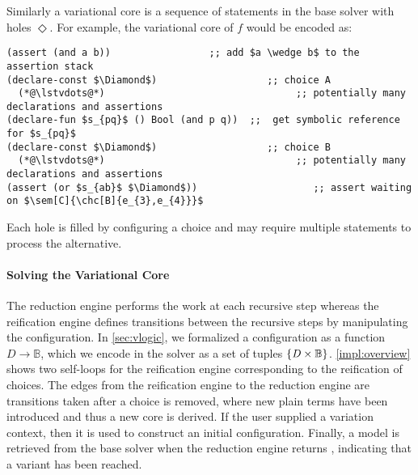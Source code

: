 Similarly a variational core is a sequence of statements in the base solver with
holes $\Diamond$. For example, the variational core of $f$ would be encoded as:
%
\begin{lstlisting}[columns=flexible,keepspaces=true]
(assert (and a b))                 ;; add $a \wedge b$ to the assertion stack
(declare-const $\Diamond$)                   ;; choice A
  (*@\lstvdots@*)                                 ;; potentially many declarations and assertions
(declare-fun $s_{pq}$ () Bool (and p q))  ;;  get symbolic reference for $s_{pq}$
(declare-const $\Diamond$)                   ;; choice B
  (*@\lstvdots@*)                                 ;; potentially many declarations and assertions
(assert (or $s_{ab}$ $\Diamond$))                    ;; assert waiting on $\sem[C]{\chc[B]{e_{3},e_{4}}}$
\end{lstlisting}
%
Each hole is filled by configuring a choice and may require multiple
statements to process the alternative.

\paragraph{Solving the Variational Core}

The reduction engine performs the work at each recursive step whereas the
reification engine defines transitions between the recursive steps by
manipulating the configuration. In \autoref{sec:vlogic}, we formalized
a configuration as a function $D\to\mathbb{B}$, which we encode in the solver
as a set of tuples $\{\mathit{D \times \mathbb{B}}\}$.
%
\autoref{impl:overview} shows two self-loops for the reification engine
corresponding to the reification of choices. The edges from the reification
engine to the reduction engine are transitions taken after a choice is removed,
where new plain terms have been introduced and thus a new core is derived. If
the user supplied a variation context, then it is used to construct an initial
configuration. Finally, a model is retrieved from the base solver when the
reduction engine returns \unit{}, indicating that a variant has been reached.

